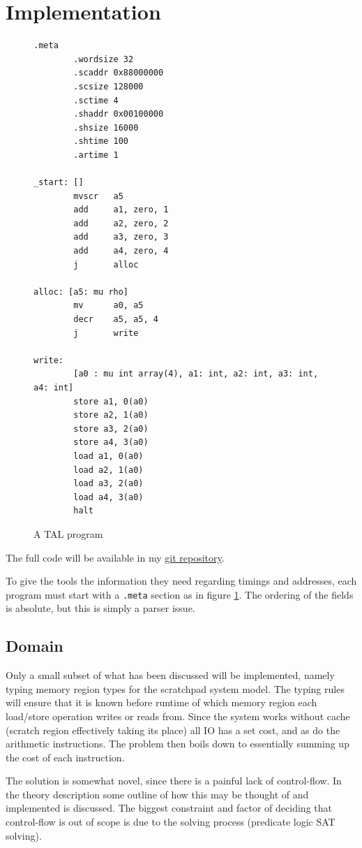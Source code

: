 \section{Implementation}
\begin{figure}
    \begin{lstlisting}
.meta
        .wordsize 32
        .scaddr 0x88000000
        .scsize 128000
        .sctime 4
        .shaddr 0x00100000
        .shsize 16000
        .shtime 100
        .artime 1

_start: []
        mvscr   a5
        add     a1, zero, 1
        add     a2, zero, 2
        add     a3, zero, 3
        add     a4, zero, 4
        j       alloc

alloc: [a5: mu rho]
        mv      a0, a5
        decr    a5, a5, 4
        j       write

write:
        [a0 : mu int array(4), a1: int, a2: int, a3: int, a4: int]
        store a1, 0(a0)
        store a2, 1(a0)
        store a3, 2(a0)
        store a4, 3(a0)
        load a1, 0(a0)
        load a2, 1(a0)
        load a3, 2(a0)
        load a4, 3(a0)
        halt
    \end{lstlisting}
    \caption{A TAL program}
    \label{fig:a-prog}
\end{figure}
The full code will be available in my \href{https://github.com/dsx992/bsc}{git repository}.

To give the tools the information they need regarding timings and addresses,
each program must start with a \texttt{.meta} section as in figure
\ref{fig:a-prog}. The ordering of the fields is absolute, but this is simply a
parser issue.

\subsection{Domain}
Only a small subset of what has been discussed will be implemented, namely
typing memory region types for the scratchpad system model.
The typing rules will ensure that it is known before runtime of which memory
region each load/store operation writes or reads from.
Since the system works without cache (scratch region effectively taking its
place) all IO has a set cost, and as do the arithmetic instructions. The
problem then boils down to essentially summing up the cost of each instruction.

The solution is somewhat novel, since there is a painful lack of control-flow.
In the theory description some outline of how this may be thought of and
implemented is discussed. The biggest constraint and factor of deciding that
control-flow is out of scope is due to the solving process (predicate logic SAT
solving).

